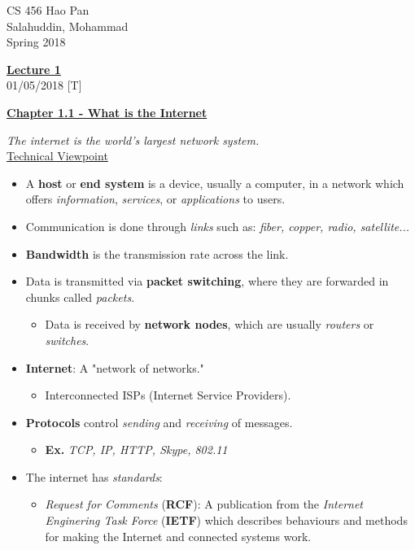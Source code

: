 \documentclass[12pt]{article}
\begin{document}
\noindent
{CS 456 \hfill Hao Pan}\\
{Salahuddin, Mohammad}\\
{Spring 2018}


\begin{center}
\underline{\large \bf Lecture 1}\\
\noindent
{\hfill 01/05/2018 [T]}
\end{center}

\underline{\bf Chapter 1.1 - What is the Internet}\\
\vspace{-4mm}

{\it The internet is the world's largest network system.}\\

\underline{Technical Viewpoint}

\begin{itemize}
\item A {\bf host} or {\bf end system} is a device, usually a computer, in a network which offers {\it information}, {\it services}, or {\it applications} to users.
\item Communication is done through {\it links} such as: {\it fiber, copper, radio, satellite...}
\item {\bf Bandwidth} is the transmission rate across the link.
\item Data is transmitted via {\bf packet switching}, where they are forwarded in chunks called {\it packets}.
\begin{itemize}
\item Data is received by {\bf network nodes}, which are usually {\it routers} or {\it switches}.
\end{itemize}

\item {\bf Internet}: A "network of networks."
\begin{itemize}
\item Interconnected ISPs (Internet Service Providers).
\end{itemize}
\item {\bf Protocols} control {\it sending} and {\it receiving} of messages.
\begin{itemize}
\item {\bf Ex.} {\it TCP, IP, HTTP, Skype, 802.11}
\end{itemize}
\item The internet has {\it standards}:
\begin{itemize}
\item {\it Request for Comments} ({\bf RCF}): A publication from the {\it Internet Enginering Task Force} ({\bf IETF}) which describes behaviours and methods for making the Internet and connected systems work.
\end{itemize}
\end{itemize}
\end{document}
